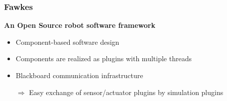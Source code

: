 \documentclass[]{beamer}
\begin{document}
\begin{frame}
  \frametitle{Fawkes}
  \begin{multicols}{2}
    \begin{figure}
    \end{figure}
    \textbf{\large An Open Source robot software framework}
    \begin{itemize}
    \item Component-based software design
    \item Components are realized as plugins with multiple threads
    \item Blackboard communication infrastructure
      \pause
    \end{itemize}
  \end{multicols}
  \begin{itemize}
  \item[$\Rightarrow$] Easy exchange of sensor/actuator plugins by simulation plugins
  \end{itemize}
\end{frame}
\end{document}
